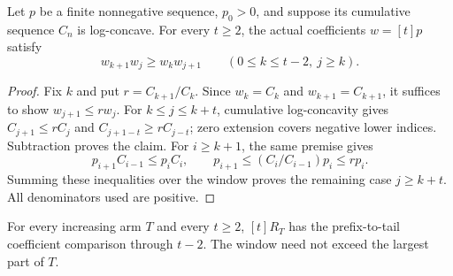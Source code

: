 \begin{lemma}
Let $p$ be a finite nonnegative sequence, $p_0>0$, and suppose
its cumulative sequence $C_n$ is log-concave. For every $t\ge2$,
the actual coefficients $w=[t]p$ satisfy
\[
 w_{k+1}w_j\ge w_kw_{j+1}\qquad(0\le k\le t-2,\ j\ge k).
\]
\end{lemma}
\begin{proof}
Fix $k$ and put $r=C_{k+1}/C_k$. Since $w_k=C_k$ and
$w_{k+1}=C_{k+1}$, it suffices to show $w_{j+1}\le rw_j$.
For $k\le j\le k+t$, cumulative log-concavity gives
$C_{j+1}\le rC_j$ and $C_{j+1-t}\ge rC_{j-t}$;
zero extension covers negative lower indices. Subtraction proves
the claim. For $i\ge k+1$, the same premise gives
\[
 p_{i+1}C_{i-1}\le p_iC_i,\qquad
 p_{i+1}\le (C_i/C_{i-1})p_i\le rp_i.
\]
Summing these inequalities over the window proves the remaining
case $j\ge k+t$. All denominators used are positive.
\end{proof}

\begin{corollary}\label{cor:deficit-window-ratios}
For every increasing arm $T$ and every $t\ge2$, $[t]R_T$
has the prefix-to-tail coefficient comparison through $t-2$.
The window need not exceed the largest part of $T$.
\end{corollary}

